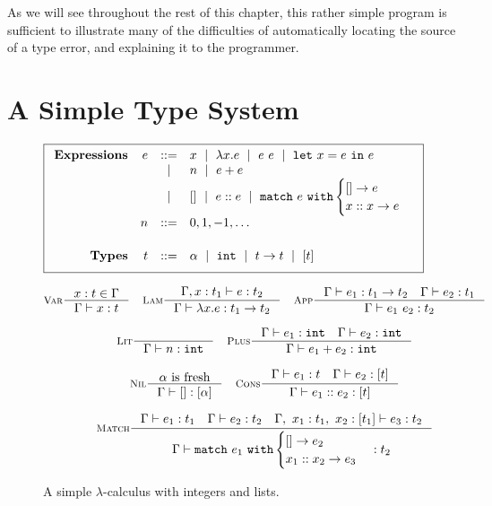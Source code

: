 As we will see throughout the rest of this chapter, this rather simple
program is sufficient to illustrate many of the difficulties of
automatically locating the source of a type error, and explaining it to
the programmer.

\section{A Simple Type System}
\label{sec:intro:simple-type}

\begin{figure}[t]
\centering
\[
\boxed{
\begin{array}{rrcl}
\mathbf{Expressions}
& e & ::=    & x \spmid \efun{x}{e} \spmid \eapp{e}{e} \spmid \elet{x}{e}{e} \\
&   & \spmid & n \spmid \eplus{e}{e}\\
&   & \spmid & \enil \spmid \econs{e}{e} \spmid \elcase{e}{e}{x}{x}{e} \\[0.05in]

& n & ::= &  0, 1, -1, \ldots \\[0.2in]

\mathbf{Types}
& t & ::= & \alpha \spmid %
            \tint \spmid \tarr{t}{t} \spmid %
            \tlist{t} \\[0.05in]
\end{array}
}
\]
\begin{framed}
\begin{gather*}
\inference[\textsc{Var}]
  {x:t \in \Gamma}
  {\jtype{\Gamma}{x}{t}}
\quad
\inference[\textsc{Lam}]
  {\jtype{\Gamma, x:t_1}{e}{t_2}}
  {\jtype{\Gamma}{\efun{x}{e}}{\tarr{t_1}{t_2}}}
\quad
\inference[\textsc{App}]
  {\jtype{\Gamma}{e_1}{\tarr{t_1}{t_2}}
   \quad
   \jtype{\Gamma}{e_2}{t_1}}
  {\jtype{\Gamma}{\eapp{e_1}{e_2}}{t_2}}
\\[0.1in]
\inference[\textsc{Lit}]
  {}
  {\jtype{\Gamma}{n}{\tint}}
\quad
\inference[\textsc{Plus}]
  {\jtype{\Gamma}{e_1}{\tint} \quad \jtype{\Gamma}{e_2}{\tint}}
  {\jtype{\Gamma}{\eplus{e_1}{e_2}}{\tint}}
\\[0.1in]
\inference[\textsc{Nil}]
  {\alpha \text{ is fresh}}
  {\jtype{\Gamma}{\enil}{\tlist{\alpha}}}
\quad
\inference[\textsc{Cons}]
  {\jtype{\Gamma}{e_1}{t} \quad \jtype{\Gamma}{e_2}{\tlist{t}}}
  {\jtype{\Gamma}{\econs{e_1}{e_2}}{\tlist{t}}}
\\[0.1in]
\inference[\textsc{Match}]
  {\jtype{\Gamma}{e_1}{t_1}
    \quad
   \jtype{\Gamma}{e_2}{t_2}
    \quad
   \jtype{\Gamma,\ x_1:t_1,\ x_2:\tlist{t_1}}{e_3}{t_2}
  }
  {\jtype{\Gamma}{\elcase{e_1}{e_2}{x_1}{x_2}{e_3}}{t_2}}
\end{gather*}
\end{framed}
\caption{A simple $\lambda$-calculus with integers and lists.}
\label{fig:intro:simple-lambda}
\end{figure}

